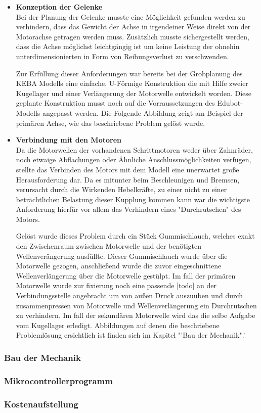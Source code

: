 \begin{itemize}
\item \textbf{Konzeption der Gelenke}\\
Bei der Planung der Gelenke musste eine Möglichkeit gefunden werden zu verhindern, dass das Gewicht der Achse in irgendeiner Weise direkt von der Motorachse getragen werden muss. Zusätzlich musste sichergestellt werden, dass die Achse möglichst leichtgängig ist um keine Leistung der ohnehin unterdimensionierten in Form von Reibungsverlust zu verschwenden.

Zur Erfüllung dieser Anforderungen war bereits bei der Grobplanung des KEBA Modells eine einfache, U-Förmige Konstruktion die mit Hilfe zweier Kugellager und einer Verlängerung der Motorwelle entwickelt worden. Diese geplante Konstruktion musst noch auf die Vorraussetzungen des Edubot-Modells angepasst werden. Die Folgende Abbildung zeigt am Beispiel der primären Achse, wie das beschriebene Problem gelöst wurde.
\item \textbf{Verbindung mit den Motoren}\\
Da die Motorwellen der vorhandenen Schrittmotoren weder über Zahnräder, noch etwaige Abflachungen oder Ähnliche Anschlussmöglichkeiten verfügen, stellte das Verbinden des Motors mit dem Modell eine unerwartet große Herausforderung dar. Da es mitunter beim Beschleunigen und Bremsen, verursacht durch die Wirkenden Hebelkräfte, zu einer nicht zu einer beträchtlichen Belastung dieser Kupplung kommen kann war die wichtigste Anforderung hierfür vor allem das Verhindern eines "Durchrutschen" des Motors. 

Gelöst wurde dieses Problem durch ein Stück Gummischlauch, welches exakt den Zwischenraum zwischen Motorwelle und der benötigten Wellenverängerung ausfüllte. Dieser Gummischlauch wurde über die Motorwelle gezogen, anschließend wurde die zuvor eingeschnittene Wellenverlängerung über die Motorwelle gestülpt. Im fall der primären Motorwelle wurde zur fixierung noch eine passende [todo] an der Verbindungsstelle angebracht um von außen Druck auszuüben und durch zusammenpressen von Motorwelle und Wellenverlängerung ein Durchrutschen zu verhindern. Im fall der sekundären Motorwelle wird das die selbe Aufgabe vom Kugellager erledigt. Abbildungen auf denen die beschriebene Problemlösung ersichtlich ist finden sich im Kapitel "'Bau der Mechanik".'
\end{itemize}
\subsubsection{Bau der Mechanik}
\subsubsection{Mikrocontrollerprogramm}
\subsubsection{Kostenaufstellung}

